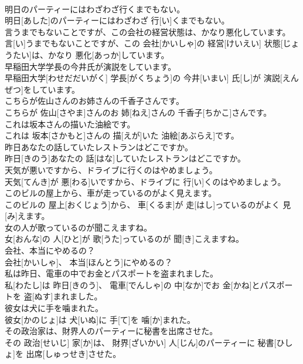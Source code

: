 \documentclass[8pt]{extreport}
\begin{document}
\begin{CJK}{UTF8}{min}
\\	明日のパーティーにはわざわざ行くまでもない。	
\\	明日[あした]のパーティーにはわざわざ 行[い]くまでもない。	
\\	言うまでもないことですが、この会社の経営状態は、かなり悪化しています。	
\\	言[い]うまでもないことですが、この 会社[かいしゃ]の 経営[けいえい] 状態[じょうたい]は、かなり 悪化[あっか]しています。	
\\	早稲田大学学長の今井氏が演説をしています。	
\\	早稲田大学[わせだだいがく] 学長[がくちょう]の 今井[いまい] 氏[し]が 演説[えんぜつ]をしています。	
\\	こちらが佐山さんのお姉さんの千香子さんです。	
\\	こちらが 佐山[さやま]さんのお 姉[ねえ]さんの 千香子[ちかこ]さんです。	
\\	これは坂本さんの描いた油絵です。	
\\	これは 坂本[さかもと]さんの 描[えが]いた 油絵[あぶらえ]です。	
\\	昨日あなたの話していたレストランはどこですか。	
\\	昨日[きのう]あなたの 話[はな]していたレストランはどこですか。	
\\	天気が悪いですから、ドライブに行くのはやめましょう。	
\\	天気[てんき]が 悪[わる]いですから、ドライブに 行[い]くのはやめましょう。	
\\	このビルの屋上から、車が走っているのがよく見えます。	
\\	このビルの 屋上[おくじょう]から、 車[くるま]が 走[はし]っているのがよく 見[み]えます。	
\\	女の人が歌っているのが聞こえますね。	
\\	女[おんな]の 人[ひと]が 歌[うた]っているのが 聞[き]こえますね。	
\\	会社、本当にやめるの？	
\\	会社[かいしゃ]、 本当[ほんとう]にやめるの？	
\\	私は昨日、電車の中でお金とパスポートを盗まれました。	
\\	私[わたし]は 昨日[きのう]、 電車[でんしゃ]の 中[なか]でお 金[かね]とパスポートを 盗[ぬす]まれました。	
\\	彼女は犬に手を噛まれた。	
\\	彼女[かのじょ]は 犬[いぬ]に 手[て]を 噛[か]まれた。	
\\	その政治家は、財界人のパーティーに秘書を出席させた。	
\\	その 政治[せいじ] 家[か]は、 財界[ざいかい] 人[じん]のパーティーに 秘書[ひしょ]を 出席[しゅっせき]させた。	

\end{CJK}
\end{document}
